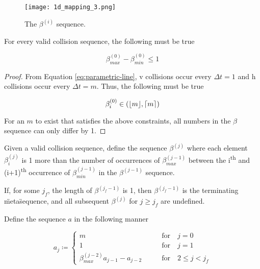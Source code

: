 \begin{figure}[H]
  \begin{center}
    \texttt{[image: 1d\_mapping\_3.png]}
  \end{center}
  \vspace{-.2in} %
  \caption{\label{fig:beta-sequence} The $\beta^{(i)}$ sequence.}
\end{figure}

\begin{theorem}\label{thm:beta_exremum}
	For every valid collision sequence, the following must be true
	
	\begin{equation}
		\beta^{(0)}_{max} - \beta^{(0)}_{min} \le 1
	\end{equation}
\end{theorem}

\begin{proof}

From Equation \ref{eq:parametric-line}, v collisions occur every $\Delta t = 1$ and h collisions occur every $\Delta t = m$. Thus, the following must be true

\begin{equation}
	\beta^{(0)}_i \in \paren{\floor{m}, \ceil{m}}
\end{equation}

For an $m$ to exist that satisfies the above constraints, all numbers in the $\beta$ sequence can only differ by 1.

\end{proof}

\begin{definition}
	Given a valid collision sequence, define the sequence $\beta^{(j)}$ where each element $\beta^{(j)}_i$ is 1 more than the number of occurrences of $\beta^{(j-1)}_{max}$ between the i\textsuperscript{th} and (i+1)\textsuperscript{th} occurrence of $\beta^{(j-1)}_{min}$ in the $\beta^{(j-1)}$ sequence.

	If, for some $j_f$, the length of $\beta^{(j_f-1)}$ is 1, then $\beta^{(j_f-1)}$ is the terminating \"meta\" sequence, and all subsequent $\beta^{(j)}$ for $j \ge j_f$ are undefined.
\end{definition}

\begin{definition}
	Define the sequence $a$ in the following manner

	\begin{equation}
		a_j \coloneqq \begin{cases}
			m \qquad &\text{for} \quad j = 0\\
			1 \qquad &\text{for} \quad j = 1\\
			\beta^{(j-2)}_{max} a_{j-1} - a_{j-2} \qquad &\text{for} \quad 2 \le j < j_f
		\end{cases}
	\end{equation}

\end{definition}

